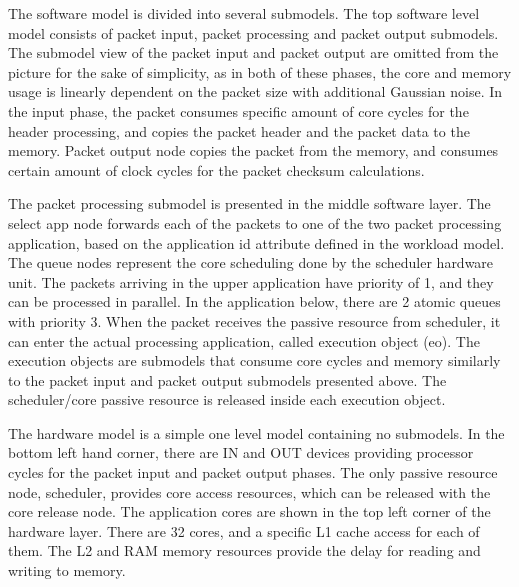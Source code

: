 
The software model is divided into several submodels. The top software level model consists of packet input, packet processing and packet output submodels. The submodel view of the packet input and packet output are omitted from the picture for the sake of simplicity, as in both of these phases, the core and memory usage is linearly dependent on the packet size with additional Gaussian noise. In the input phase, the packet consumes specific amount of core cycles for the header processing, and copies the packet header and the packet data to the memory. Packet output node copies the packet from the memory, and consumes certain amount of clock cycles for the packet checksum calculations.

The packet processing submodel is presented in the middle software layer. The select app node forwards each of the packets to one of the two packet processing application, based on the application id attribute defined in the workload model. The queue nodes represent the core scheduling done by the scheduler hardware unit. The packets arriving in the upper application have priority of 1, and they can be processed in parallel. In the application below, there are 2 atomic queues with priority 3. When the packet receives the passive resource from scheduler, it can enter the actual processing application, called execution object (eo). The execution objects are submodels that consume core cycles and memory similarly to the packet input and packet output submodels presented above. The scheduler/core passive resource is released inside each execution object.

The hardware model is a simple one level model containing no submodels. In the bottom left hand corner, there are IN and OUT devices providing processor cycles for the packet input and packet output phases. The only passive resource node, scheduler, provides core access resources, which can be released with the core release node. The application cores are shown in the top left corner of the hardware layer. There are 32 cores, and a specific L1 cache access for each of them. The L2 and RAM memory resources provide the delay for reading and writing to memory.

